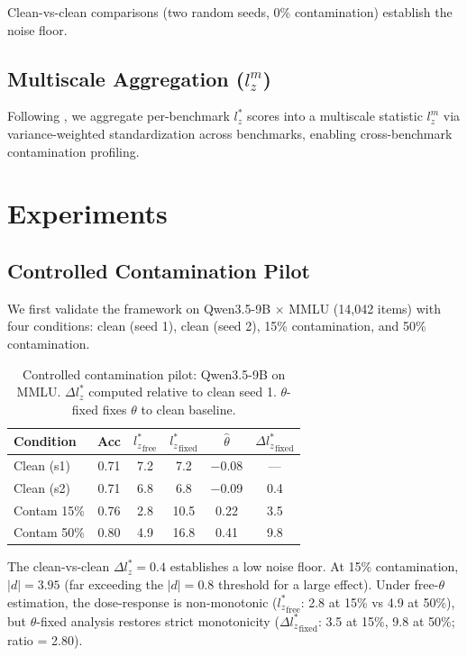 \documentclass[11pt,a4paper]{article}
\newcommand{\lzstar}{$l_{z}^{*}$}
\newcommand{\lzm}{$l_{z}^{m}$}
\newcommand{\thetafix}{$\theta$-fixed}
\begin{document}
Clean-vs-clean comparisons (two random seeds, 0\% contamination) establish the noise floor.

\subsection{Multiscale Aggregation ($l_z^m$)}

Following \citet{hong2021multiscale}, we aggregate per-benchmark \lzstar{} scores into a multiscale statistic \lzm{} via variance-weighted standardization across benchmarks, enabling cross-benchmark contamination profiling.

\section{Experiments}
\label{sec:experiments}

\subsection{Controlled Contamination Pilot}
\label{sec:pilot}

We first validate the framework on Qwen3.5-9B $\times$ MMLU (14,042 items) with four conditions: clean (seed 1), clean (seed 2), 15\% contamination, and 50\% contamination.

\begin{table}[h]
\centering
\small
\caption{Controlled contamination pilot: Qwen3.5-9B on MMLU. $\Delta l_z^*$ computed relative to clean seed 1. \thetafix{} fixes $\theta$ to clean baseline.}
\label{tab:pilot}
\begin{tabular}{lccccc}
\toprule
\textbf{Condition} & \textbf{Acc} & ${l_z^*}_{\text{free}}$ & ${l_z^*}_{\text{fixed}}$ & $\hat\theta$ & ${\Delta l_z^*}_{\text{fixed}}$ \\
\midrule
Clean (s1) & 0.71 & 7.2 & 7.2 & $-$0.08 & --- \\
Clean (s2) & 0.71 & 6.8 & 6.8 & $-$0.09 & 0.4 \\
Contam 15\% & 0.76 & 2.8 & 10.5 & 0.22 & 3.5 \\
Contam 50\% & 0.80 & 4.9 & 16.8 & 0.41 & 9.8 \\
\bottomrule
\end{tabular}
\end{table}

The clean-vs-clean $\Delta l_z^* = 0.4$ establishes a low noise floor.
At 15\% contamination, $|d| = 3.95$ (far exceeding the $|d| = 0.8$ threshold for a large effect).
Under free-$\theta$ estimation, the dose-response is non-monotonic (${l_z^*}_\text{free}$: 2.8 at 15\% vs 4.9 at 50\%), but \thetafix{} analysis restores strict monotonicity (${\Delta l_z^*}_\text{fixed}$: 3.5 at 15\%, 9.8 at 50\%; ratio = 2.80).
\end{document}
